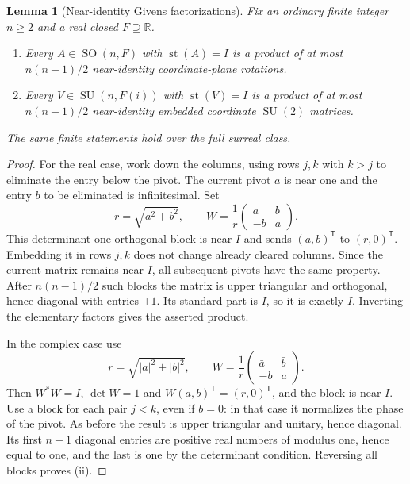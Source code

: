 \documentclass[11pt,letterpaper]{article}
\numberwithin{equation}{section}
\newtheorem{lemma}[lemma]{Lemma}
\theoremstyle{definition}
\theoremstyle{remark}
\newcommand{\R}{\mathbb R}
\newcommand{\st}{\operatorname{st}}
\newcommand{\SO}{\operatorname{SO}}
\newcommand{\SU}{\operatorname{SU}}
\newcommand{\transpose}{^{\mathsf T}}
\begin{document}
\begin{lemma}[Near-identity Givens factorizations]\label{e3:cut:lem:givens}
Fix an ordinary finite integer $n\ge2$ and a real closed $F\supseteq\R$.
\begin{enumerate}[label=\textup{(\roman*)}]
\item Every $A\in\SO(n,F)$ with $\st(A)=I$ is a product of at most $n(n-1)/2$
near-identity coordinate-plane rotations.
\item Every $V\in\SU(n,F(i))$ with $\st(V)=I$ is a product of at most
$n(n-1)/2$ near-identity embedded coordinate $\SU(2)$ matrices.
\end{enumerate}
The same finite statements hold over the full surreal class.
\end{lemma}
\begin{proof}
For the real case, work down the columns, using rows $j,k$ with $k>j$ to
eliminate the entry below the pivot. The current pivot $a$ is near one and the
entry $b$ to be eliminated is infinitesimal. Set
\[
 r=\sqrt{a^2+b^2},\qquad
 W=\frac1r\begin{pmatrix}a&b\\-b&a\end{pmatrix}.
\]
This determinant-one orthogonal block is near $I$ and sends
$(a,b)\transpose$ to $(r,0)\transpose$. Embedding it in rows $j,k$ does not
change already cleared columns. Since the current matrix remains near $I$, all
subsequent pivots have the same property. After $n(n-1)/2$ such blocks the
matrix is upper triangular and orthogonal, hence diagonal with entries $\pm1$.
Its standard part is $I$, so it is exactly $I$. Inverting the elementary factors
gives the asserted product.

In the complex case use
\begin{equation}\label{e3:cut:eq:complexgivens}
 r=\sqrt{|a|^2+|b|^2},\qquad
 W=\frac1r\begin{pmatrix}\bar a&\bar b\\-b&a\end{pmatrix}.
\end{equation}
Then $W^*W=I$, $\det W=1$ and $W(a,b)\transpose=(r,0)\transpose$, and the block
is near $I$. Use a block for each pair $j<k$, even if $b=0$: in that case it
normalizes the phase of the pivot. As before the result is upper triangular and
unitary, hence diagonal. Its first $n-1$ diagonal entries are positive real
numbers of modulus one, hence equal to one, and the last is one by the
determinant condition. Reversing all blocks proves (ii).
\end{proof}
\end{document}
